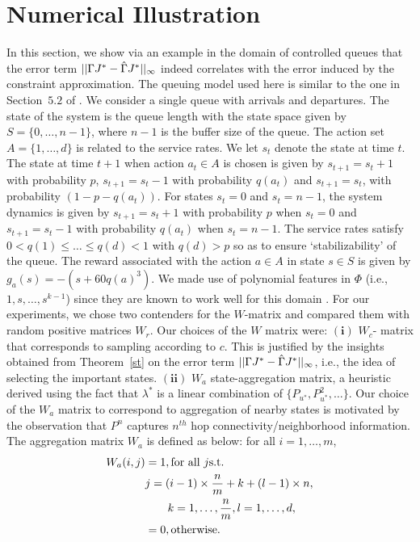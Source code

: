 \section{Numerical Illustration}
In this section, we show via an example in the domain of controlled queues that the error term $||\Gamma J^*-\hat{\Gamma} J^*||_\infty$ indeed correlates with
 the error induced by the constraint approximation. The queuing model used here is similar to the one in Section~$5.2$ of \cite{ALP}. We consider a single queue with arrivals and departures. The state of the system is the queue length with the state space given by $S=\{0,\ldots,n-1\}$, where $n-1$ is the buffer size of the queue. The action set $A=\{1,\ldots,d\}$ is related to the service rates. We let $s_t$ denote the state at time $t$. The state at time $t+1$ when action $a_t \in A $ is chosen is given by $s_{t+1}= s_{t}+1$ with probability $p$, $s_{t+1}= s_{t}-1$ with probability $q(a_t)$ and $s_{t+1}= s_t$, with probability $(1-p-q(a_t))$. For states $s_t=0$ and $s_t=n-1$, the system dynamics is given by 	$s_{t+1}= s_{t}+1$ with probability $p$ when $s_t=0$ and $s_{t+1}=s_t-1$ with probability $q(a_t)$ when $s_t=n-1$. The service rates satisfy $0<q(1)\leq \ldots\leq q(d)<1$ with $q(d)>p$ so as to ensure `stabilizability' of the queue. The reward associated with the action $a \in A$ in state $s\in S$ is given by $g_a(s)=-(s+60q(a)^3)$. We made use of polynomial features in $\Phi$ (i.e., $1,s,\ldots,s^{k-1}$) since they are known to work well for this domain \cite{ALP}.
For our experiments, we chose two contenders for the $W$-matrix and compared them with random positive matrices $W_r$. Our choices of the $W$ matrix were: {$\mathbf{(i)}$} $W_c$- matrix that corresponds to sampling according to $c$. This is justified by the insights obtained from Theorem~\ref{st} on the error term $||\Gamma J^*-\hat{\Gamma} J^*||_\infty$, i.e., the idea of selecting the important states. {$\mathbf{(ii)}$} $W_a$ state-aggregation matrix, a heuristic derived using the fact that $\lambda^*$ is a linear combination of $\{P_{u^*},P^2_{u^*},\ldots\}$. Our choice of the $W_a$ matrix to correspond to aggregation of nearby states is motivated by the observation that $P^n$ captures $n^{th}$ hop connectivity/neighborhood information. 
The aggregation matrix $W_a$ is defined as below: for all $ i=1,\ldots,m$,
\begin{align}\label{wdes}
W_a(i,j)&=1, \mb\text{for all } j\mb\text{s.t.}\mb \nn\\&j=(i-1)\times\frac{n}{m}+k+(l-1)\times n, \nn\\&\mb\quad\quad k=1,\ldots,\frac{n}{m}, l=1,\ldots,d,\nn\\
&=0,\mb\text{otherwise}.
\end{align}
